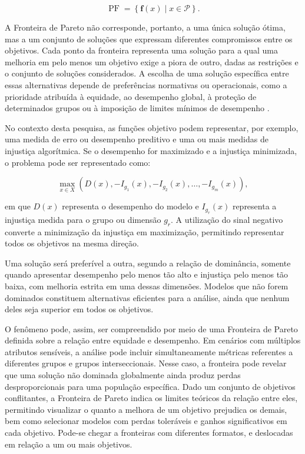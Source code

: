 \begin{equation}
    \operatorname{PF}
    =
    \left\{
        \mathbf{f}(x) \mid x \in \mathcal{P}
    \right\}.
\end{equation}

A Fronteira de Pareto não corresponde, portanto, a uma única solução
ótima, mas a um conjunto de soluções que expressam diferentes
compromissos entre os objetivos. Cada ponto da fronteira representa
uma solução para a qual uma melhoria em pelo menos um objetivo exige
a piora de outro, dadas as restrições e o conjunto de soluções
considerados. A escolha de uma solução específica entre essas
alternativas depende de preferências normativas ou operacionais, como
a prioridade atribuída à equidade, ao desempenho global, à proteção
de determinados grupos ou à imposição de limites mínimos de
desempenho \cite{miettinen1999nonlinear,deb2015multi}.

No contexto desta pesquisa, as funções objetivo podem representar,
por exemplo, uma medida de erro ou desempenho preditivo e uma ou mais
medidas de injustiça algorítmica. Se o desempenho for maximizado e a
injustiça minimizada, o problema pode ser representado como:

\begin{equation}
    \max_{x \in X}
    \left(
        D(x),
        -I_{g_1}(x),
        -I_{g_2}(x),
        \ldots,
        -I_{g_m}(x)
    \right),
\end{equation}

em que $D(x)$ representa o desempenho do modelo e
$I_{g_r}(x)$ representa a injustiça medida para o grupo ou dimensão
$g_r$. A utilização do sinal negativo converte a minimização da
injustiça em maximização, permitindo representar todos os objetivos
na mesma direção.

Uma solução será preferível a outra, segundo a relação de dominância,
somente quando apresentar desempenho pelo menos tão alto e injustiça
pelo menos tão baixa, com melhoria estrita em uma dessas dimensões.
Modelos que não forem dominados constituem alternativas eficientes
para a análise, ainda que nenhum deles seja superior em todos os
objetivos.

O fenômeno pode, assim, ser compreendido por meio de uma Fronteira de
Pareto definida sobre a relação entre equidade e desempenho. Em cenários com múltiplos atributos sensíveis, a análise pode incluir simultaneamente métricas referentes a diferentes grupos e grupos interseccionais. Nesse caso, a fronteira pode revelar que uma solução não dominada globalmente
ainda produz perdas desproporcionais para uma população específica. Dado um conjunto de objetivos conflitantes, a Fronteira de Pareto indica os limites teóricos da relação entre eles, permitindo visualizar o quanto a melhora de um objetivo prejudica os demais, bem como selecionar modelos com perdas toleráveis e ganhos significativos em cada objetivo. Pode-se chegar a fronteiras com diferentes formatos, e deslocadas em relação a um ou mais objetivos.

